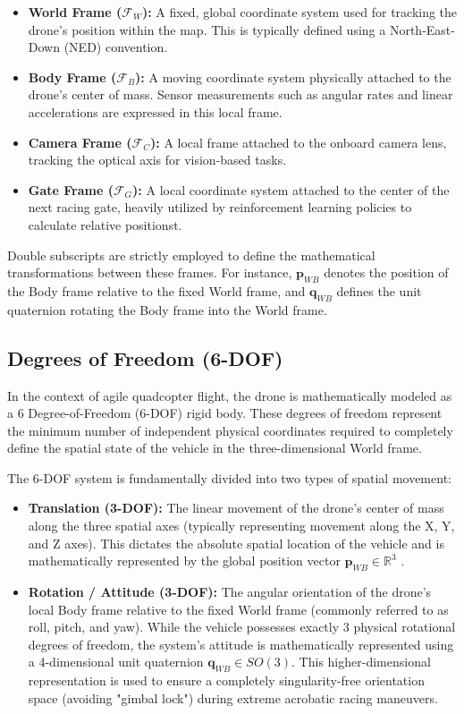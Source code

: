\documentclass{article}
\begin{document}
\begin{itemize}
    \item \textbf{World Frame ($\mathcal{F}_W$):} A fixed, global coordinate system used for tracking the drone's position within the map. This is typically defined using a North-East-Down (NED) convention.
    \item \textbf{Body Frame ($\mathcal{F}_B$):} A moving coordinate system physically attached to the drone's center of mass. Sensor measurements such as angular rates and linear accelerations are expressed in this local frame.
    \item \textbf{Camera Frame ($\mathcal{F}_C$):} A local frame attached to the onboard camera lens, tracking the optical axis for vision-based tasks.
    \item \textbf{Gate Frame ($\mathcal{F}_G$):} A local coordinate system attached to the center of the next racing gate, heavily utilized by reinforcement learning policies to calculate relative positionst.
\end{itemize}

Double subscripts are strictly employed to define the mathematical transformations between these frames. For instance, $\mathbf{p}_{WB}$ denotes the position of the Body frame relative to the fixed World frame, and $\mathbf{q}_{WB}$ defines the unit quaternion rotating the Body frame into the World frame.

\subsection{Degrees of Freedom (6-DOF)}
In the context of agile quadcopter flight, the drone is mathematically modeled as a 6 Degree-of-Freedom (6-DOF) rigid body. These degrees of freedom represent the minimum number of independent physical coordinates required to completely define the spatial state of the vehicle in the three-dimensional World frame. 

The 6-DOF system is fundamentally divided into two types of spatial movement:
\begin{itemize}
    \item \textbf{Translation (3-DOF):} The linear movement of the drone's center of mass along the three spatial axes (typically representing movement along the X, Y, and Z axes). This dictates the absolute spatial location of the vehicle and is mathematically represented by the global position vector $\mathbf{p}_{WB} \in \mathbb{R}^3$ .
    \item \textbf{Rotation / Attitude (3-DOF):} The angular orientation of the drone's local Body frame relative to the fixed World frame (commonly referred to as roll, pitch, and yaw). While the vehicle possesses exactly 3 physical rotational degrees of freedom, the system's attitude is mathematically represented using a 4-dimensional unit quaternion $\mathbf{q}_{WB} \in SO(3)$. This higher-dimensional representation is used to ensure a completely singularity-free orientation space (avoiding "gimbal lock") during extreme acrobatic racing maneuvers.
\end{itemize}
\end{document}

